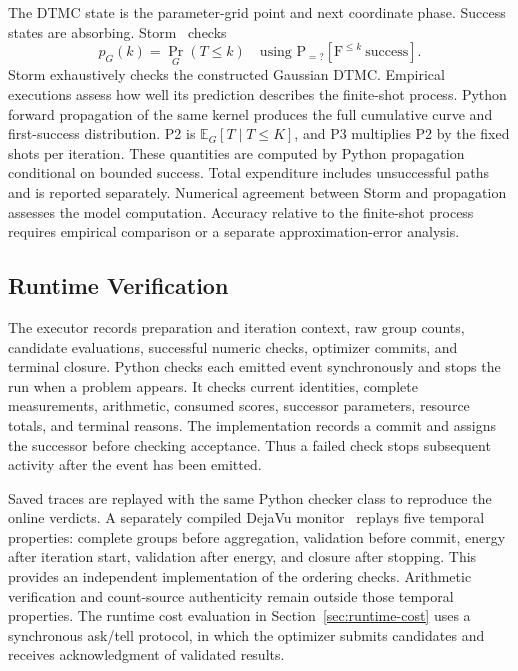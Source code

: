\documentclass[conference]{IEEEtran}
\begin{document}
The DTMC state is the parameter-grid point and next coordinate phase. Success states are absorbing. Storm~\cite{storm} checks
\begin{equation}
 p_G(k)=\Pr_G(T\leq k)
 \quad\text{using }\mathrm{P}_{=?}[\mathrm F^{\leq k}\ \mathrm{success}].
 \label{eq:reachability}
\end{equation}
Storm exhaustively checks the constructed Gaussian DTMC. Empirical executions assess how well its prediction describes the finite-shot process. Python forward propagation of the same kernel produces the full cumulative curve and first-success distribution. P2 is $\mathbb E_G[T\mid T\leq K]$, and P3 multiplies P2 by the fixed shots per iteration. These quantities are computed by Python propagation conditional on bounded success. Total expenditure includes unsuccessful paths and is reported separately. Numerical agreement between Storm and propagation assesses the model computation. Accuracy relative to the finite-shot process requires empirical comparison or a separate approximation-error analysis.

\subsection{Runtime Verification}
\label{sec:runtime}
The executor records preparation and iteration context, raw group counts, candidate evaluations, successful numeric checks, optimizer commits, and terminal closure. Python checks each emitted event synchronously and stops the run when a problem appears. It checks current identities, complete measurements, arithmetic, consumed scores, successor parameters, resource totals, and terminal reasons. The implementation records a commit and assigns the successor before checking acceptance. Thus a failed check stops subsequent activity after the event has been emitted.

Saved traces are replayed with the same Python checker class to reproduce the online verdicts. A separately compiled DejaVu monitor~\cite{dejavu} replays five temporal properties: complete groups before aggregation, validation before commit, energy after iteration start, validation after energy, and closure after stopping. This provides an independent implementation of the ordering checks. Arithmetic verification and count-source authenticity remain outside those temporal properties. The runtime cost evaluation in Section~\ref{sec:runtime-cost} uses a synchronous ask/tell protocol, in which the optimizer submits candidates and receives acknowledgment of validated results.
\end{document}
